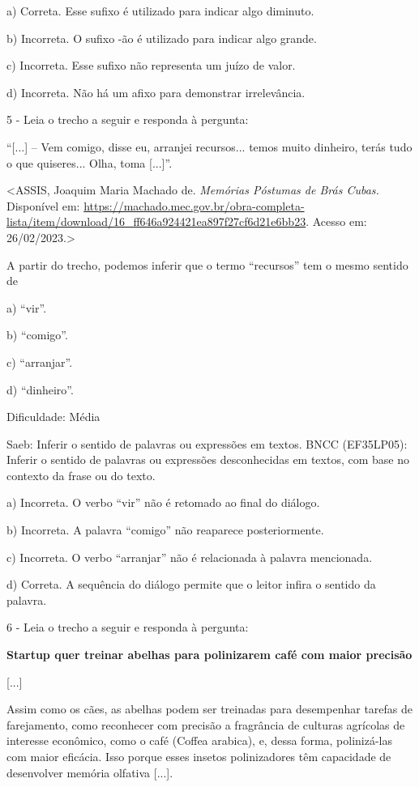 a) Correta. Esse sufixo é utilizado para indicar algo diminuto.

b) Incorreta. O sufixo -ão é utilizado para indicar algo grande.

c) Incorreta. Esse sufixo não representa um juízo de valor.

d) Incorreta. Não há um afixo para demonstrar irrelevância.

5 - Leia o trecho a seguir e responda à pergunta:

``{[}...{]} -- Vem comigo, disse eu, arranjei recursos... temos muito
dinheiro, terás tudo o que quiseres... Olha, toma {[}...{]}''.

\textless{}ASSIS, Joaquim Maria Machado de. \emph{Memórias Póstumas de
Brás Cubas.} Disponível em:
\url{https://machado.mec.gov.br/obra-completa-lista/item/download/16_ff646a924421ea897f27cf6d21e6bb23}.
Acesso em: 26/02/2023.\textgreater{}

A partir do trecho, podemos inferir que o termo ``recursos'' tem o mesmo
sentido de

a) ``vir''.

b) ``comigo''.

c) ``arranjar''.

d) ``dinheiro''.

Dificuldade: Média

Saeb: Inferir o sentido de palavras ou expressões em textos. BNCC
(EF35LP05): Inferir o sentido de palavras ou expressões desconhecidas em
textos, com base no contexto da frase ou do texto.

a) Incorreta. O verbo ``vir'' não é retomado ao final do diálogo.

b) Incorreta. A palavra ``comigo'' não reaparece posteriormente.

c) Incorreta. O verbo ``arranjar'' não é relacionada à palavra
mencionada.

d) Correta. A sequência do diálogo permite que o leitor infira o sentido
da palavra.

6 - Leia o trecho a seguir e responda à pergunta:

\textbf{Startup quer treinar abelhas para polinizarem café com maior
precisão}

{[}...{]}

Assim como os cães, as abelhas podem ser treinadas para desempenhar
tarefas de farejamento, como reconhecer com precisão a fragrância de
culturas agrícolas de interesse econômico, como o café (Coffea arabica),
e, dessa forma, polinizá-las com maior eficácia. Isso porque esses
insetos polinizadores têm capacidade de desenvolver memória olfativa
{[}...{]}.

